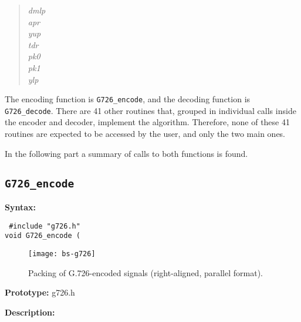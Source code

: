 \begin{quote}
 {\em dmlp} \hfill {}\\
 {\em apr} \hfill {}\\
 {\em yup} \hfill {}\\
 {\em tdr} \hfill {}\\
 {\em pk0} \hfill {}\\
 {\em pk1} \hfill {}\\
 {\em ylp} \hfill {}\\
\end{quote}


The encoding function is {\tt G726\_encode}, and the decoding function
is {\tt G726\_decode}. There are 41 other routines that, grouped in
individual calls inside the encoder and decoder, implement the
algorithm. Therefore, none of these 41 routines are expected to be
accessed by the user, and only the two main ones.

In the following part a summary of calls to both functions is found.

\subsection{{\tt G726\_encode}}

{\bf Syntax: }

{\tt
\#include "g726.h"\\
void G726\_encode
         (
}

\begin{figure}
  \begin{center}
    \texttt{[image: bs-g726]}
  \end{center}
  \caption{\SF Packing of G.726-encoded signals (right-aligned,
               parallel format).\label{G726-bs}}
\end{figure}

{\bf Prototype: }    g726.h

{\bf Description: }

